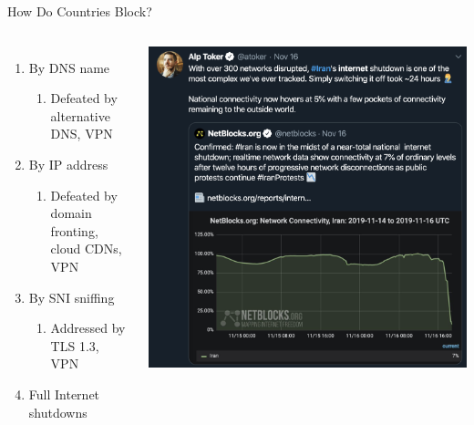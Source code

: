 \documentclass[nobackground,dvipsnames,table]{beamer}
\begin{document}
\begin{frame}{How Do Countries Block?}
    \begin{columns}
            \begin{enumerate}
                \item By DNS name
                \begin{enumerate}
                    \item \small{Defeated by alternative DNS, VPN}
                \end{enumerate}
        
                \item By IP address
                \begin{enumerate}
                    \item \small{Defeated by domain fronting, cloud CDNs, VPN}
                \end{enumerate}
        
                \item By SNI sniffing
                \begin{enumerate}
                    \item \small{Addressed by TLS 1.3, VPN}
                \end{enumerate}
        
                \item Full Internet shutdowns
            \end{enumerate}
            \includegraphics[width=\textwidth]{iran-internet-shutdown-2019}
    \end{columns}
\end{frame}
\end{document}
